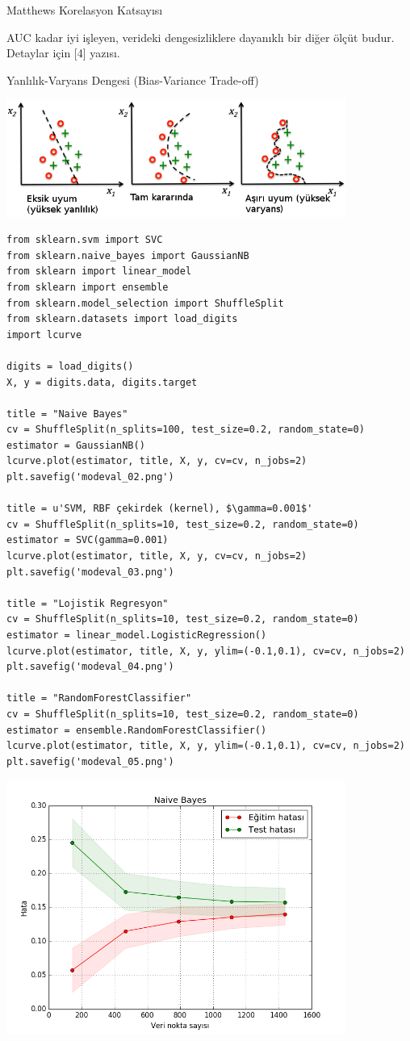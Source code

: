 \documentclass[12pt,fleqn]{article}\usepackage{../../common}
\begin{document}
Matthews Korelasyon Katsayısı

AUC kadar iyi işleyen, verideki dengesizliklere dayanıklı bir diğer ölçüt
budur. Detaylar için [4] yazısı.


Yanlılık-Varyans Dengesi  (Bias-Variance Trade-off)

\includegraphics[width=30em]{modeval_01.png}

\begin{verbatim}
from sklearn.svm import SVC
from sklearn.naive_bayes import GaussianNB
from sklearn import linear_model
from sklearn import ensemble
from sklearn.model_selection import ShuffleSplit
from sklearn.datasets import load_digits
import lcurve

digits = load_digits()
X, y = digits.data, digits.target

title = "Naive Bayes"
cv = ShuffleSplit(n_splits=100, test_size=0.2, random_state=0)
estimator = GaussianNB()
lcurve.plot(estimator, title, X, y, cv=cv, n_jobs=2)
plt.savefig('modeval_02.png')

title = u'SVM, RBF çekirdek (kernel), $\gamma=0.001$'
cv = ShuffleSplit(n_splits=10, test_size=0.2, random_state=0)
estimator = SVC(gamma=0.001)
lcurve.plot(estimator, title, X, y, cv=cv, n_jobs=2)
plt.savefig('modeval_03.png')

title = "Lojistik Regresyon"
cv = ShuffleSplit(n_splits=10, test_size=0.2, random_state=0)
estimator = linear_model.LogisticRegression()
lcurve.plot(estimator, title, X, y, ylim=(-0.1,0.1), cv=cv, n_jobs=2)
plt.savefig('modeval_04.png')

title = "RandomForestClassifier"
cv = ShuffleSplit(n_splits=10, test_size=0.2, random_state=0)
estimator = ensemble.RandomForestClassifier()
lcurve.plot(estimator, title, X, y, ylim=(-0.1,0.1), cv=cv, n_jobs=2)
plt.savefig('modeval_05.png')
\end{verbatim}

\includegraphics[width=30em]{modeval_02.png}
\end{document}
